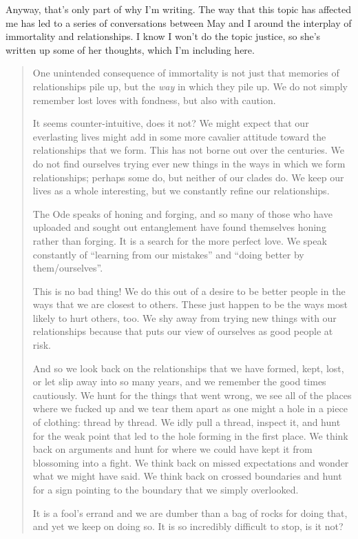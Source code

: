 Anyway, that's only part of why I'm writing. The way that this topic has affected me has led to a series of conversations between May and I around the interplay of immortality and relationships. I know I won't do the topic justice, so she's written up some of her thoughts, which I'm including here.

\begin{quote}
One unintended consequence of immortality is not just that memories of relationships pile up, but the \emph{way} in which they pile up. We do not simply remember lost loves with fondness, but also with caution.

It seems counter-intuitive, does it not? We might expect that our everlasting lives might add in some more cavalier attitude toward the relationships that we form. This has not borne out over the centuries. We do not find ourselves trying ever new things in the ways in which we form relationships; perhaps some do, but neither of our clades do. We keep our lives as a whole interesting, but we constantly refine our relationships.

The Ode speaks of honing and forging, and so many of those who have uploaded and sought out entanglement have found themselves honing rather than forging. It is a search for the more perfect love. We speak constantly of ``learning from our mistakes'' and ``doing better by them/ourselves''.

This is no bad thing! We do this out of a desire to be better people in the ways that we are closest to others. These just happen to be the ways most likely to hurt others, too. We shy away from trying new things with our relationships because that puts our view of ourselves as good people at risk.

And so we look back on the relationships that we have formed, kept, lost, or let slip away into so many years, and we remember the good times cautiously. We hunt for the things that went wrong, we see all of the places where we fucked up and we tear them apart as one might a hole in a piece of clothing: thread by thread. We idly pull a thread, inspect it, and hunt for the weak point that led to the hole forming in the first place. We think back on arguments and hunt for where we could have kept it from blossoming into a fight. We think back on missed expectations and wonder what we might have said. We think back on crossed boundaries and hunt for a sign pointing to the boundary that we simply overlooked.

It is a fool's errand and we are dumber than a bag of rocks for doing that, and yet we keep on doing so. It is so incredibly difficult to stop, is it not?


\end{quote}
